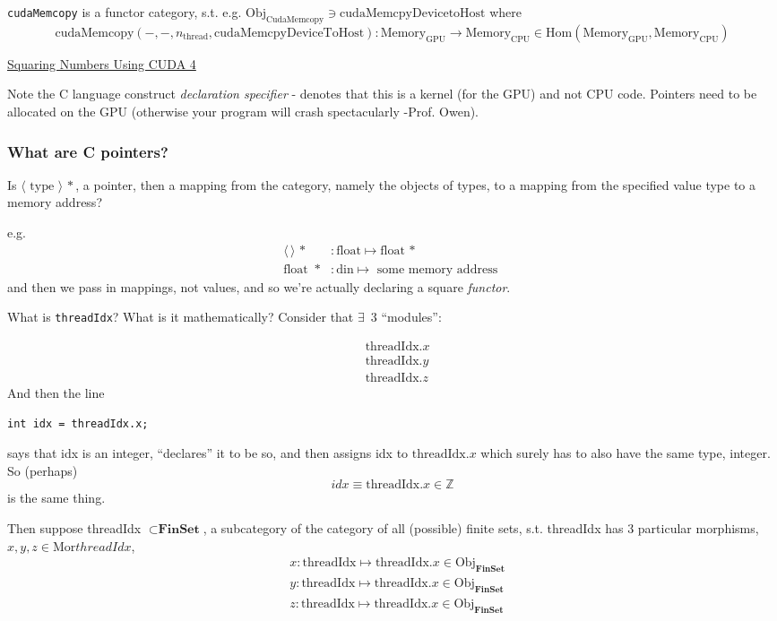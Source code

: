 \documentclass[10pt]{amsart}
\begin{document}
\begin{multicols*}{2}
\verb|cudaMemcopy| is a functor category, s.t. e.g. $\text{Obj}_{\text{CudaMemcopy}} \ni \text{cudaMemcpyDevicetoHost}$ where
\[
\text{cudaMemcopy}(-,-,n_{\text{thread}},\text{cudaMemcpyDeviceToHost}): \text{Memory}_{\text{GPU}} \to \text{Memory}_{\text{CPU}} \in \text{Hom}(\text{Memory}_{\text{GPU}}, \text{Memory}_{\text{CPU}})
\]

\href{https://classroom.udacity.com/courses/cs344/lessons/55120467/concepts/670742910923}{Squaring Numbers Using CUDA 4}

Note the C language construct \emph{declaration specifier} - denotes that this is a kernel (for the GPU) and not CPU code.  Pointers need to be allocated on the GPU (otherwise your program will crash spectacularly -Prof. Owen).  

\subsubsection{What are C pointers?}

Is $\langle \text{ type } \rangle \, *$, a pointer, then a mapping from the category, namely the objects of types, to a mapping from the specified value type to a memory address?

e.g.
\[
\begin{aligned}
  \langle \, \rangle \, * & : \text{float} \mapsto \text{float} \, * \\ 
  \text{float } \, * & : \text{din} \mapsto \text{ some memory address }
\end{aligned}
\]
and then we pass in mappings, not values, and so we're actually declaring a square \emph{functor}.

What is \verb|threadIdx|?  What is it mathematically?  Consider that $\exists \,$ 3 ``modules'':

\[
\begin{aligned}
  & \text{threadIdx}.x \\
  & \text{threadIdx}.y \\
  & \text{threadIdx}.z 
\end{aligned}
\]
And then the line
\begin{lstlisting}
int idx = threadIdx.x;
  \end{lstlisting}
says that idx is an integer, ``declares'' it to be so, and then assigns idx to $\text{threadIdx}.x$ which surely has to also have the same type, integer.  So (perhaps)
\[
idx \equiv \text{threadIdx}.x \in \mathbb{Z}
\]
is the same thing.

Then suppose threadIdx $\subset \mathbf{\text{FinSet}}$, a subcategory of the category of all (possible) finite sets, s.t. threadIdx has 3 particular morphisms, $x,y,z\in \text{Mor}threadIdx$,
\[
\begin{aligned}
  & x : \text{threadIdx} \mapsto \text{threadIdx}.x \in \text{Obj}_{\mathbf{\text{FinSet}}} \\ 
  & y : \text{threadIdx} \mapsto \text{threadIdx}.x \in \text{Obj}_{\mathbf{\text{FinSet}}} \\ 
  & z : \text{threadIdx} \mapsto \text{threadIdx}.x \in \text{Obj}_{\mathbf{\text{FinSet}}}  
\end{aligned}
\]


\end{multicols*}
\end{document}
